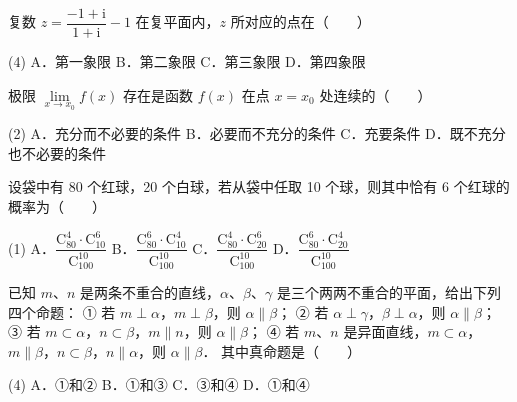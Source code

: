 

\begin{question}
复数 $z = \dfrac{-1+\mathrm{i}}{1+\mathrm{i}} - 1$ 在复平面内，$z$ 所对应的点在\mbox{（　　）}

\begin{gkopts}(4)
\task A．第一象限
\task B．第二象限
\task C．第三象限
\task D．第四象限
\end{gkopts}

\end{question}
\begin{question}
极限 $\lim\limits_{x \to x_0} f(x)$ 存在是函数 $f(x)$ 在点 $x = x_0$ 处连续的\mbox{（　　）}

\begin{gkopts}(2)
\task A．充分而不必要的条件
\task B．必要而不充分的条件
\task C．充要条件
\task D．既不充分也不必要的条件
\end{gkopts}

\end{question}
\begin{question}
设袋中有 80 个红球，20 个白球，若从袋中任取 10 个球，则其中恰有 6 个红球的概率为\mbox{（　　）}

\begin{gkopts}(1)
\task A．$\dfrac{\mathrm{C}_{80}^{4} \cdot \mathrm{C}_{10}^{6}}{\mathrm{C}_{100}^{10}}$
\task B．$\dfrac{\mathrm{C}_{80}^{6} \cdot \mathrm{C}_{10}^{4}}{\mathrm{C}_{100}^{10}}$
\task C．$\dfrac{\mathrm{C}_{80}^{4} \cdot \mathrm{C}_{20}^{6}}{\mathrm{C}_{100}^{10}}$
\task D．$\dfrac{\mathrm{C}_{80}^{6} \cdot \mathrm{C}_{20}^{4}}{\mathrm{C}_{100}^{10}}$
\end{gkopts}

\end{question}
\begin{question}
已知 $m$、$n$ 是两条不重合的直线，$\alpha$、$\beta$、$\gamma$ 是三个两两不重合的平面，给出下列四个命题：
① 若 $m \perp \alpha$，$m \perp \beta$，则 $\alpha \parallel \beta$；
② 若 $\alpha \perp \gamma$，$\beta \perp \alpha$，则 $\alpha \parallel \beta$；
③ 若 $m \subset \alpha$，$n \subset \beta$，$m \parallel n$，则 $\alpha \parallel \beta$；
④ 若 $m$、$n$ 是异面直线，$m \subset \alpha$，$m \parallel \beta$，$n \subset \beta$，$n \parallel \alpha$，则 $\alpha \parallel \beta$．
其中真命题是\mbox{（　　）}

\begin{gkopts}(4)
\task A．①和②
\task B．①和③
\task C．③和④
\task D．①和④
\end{gkopts}

\end{question}
